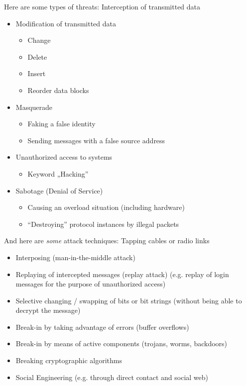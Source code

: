 \documentclass[11pt]{article}
\begin{document}
Here are some types of threats:
Interception of transmitted data
\begin{itemize}
\item Modification of transmitted data
\begin{itemize}
\item Change
\item Delete
\item Insert
\item Reorder data blocks
\end{itemize}
\item Masquerade
\begin{itemize}
\item Faking a false identity
\item Sending messages with a false source address
\end{itemize}
\item Unauthorized access to systems
\begin{itemize}
\item Keyword „Hacking”
\end{itemize}
\item Sabotage (Denial of Service)
\begin{itemize}
\item Causing an overload situation (including hardware)
\item “Destroying” protocol instances by illegal packets
\end{itemize}
\end{itemize}

And here are \emph{some} attack techniques:
Tapping cables or radio links
\begin{itemize}
\item Interposing (man-in-the-middle attack)
\item Replaying of intercepted messages (replay attack) (e.g. replay of login messages for the purpose of unauthorized access)
\item Selective changing / swapping of bits or bit strings (without being able to decrypt the message)
\item Break-in by taking advantage of errors (buffer overflows)
\item Break-in by means of active components (trojans, worms, backdoors)
\item Breaking cryptographic algorithms
\item Social Engineering (e.g. through direct contact and social web)
\end{itemize}
\end{document}
